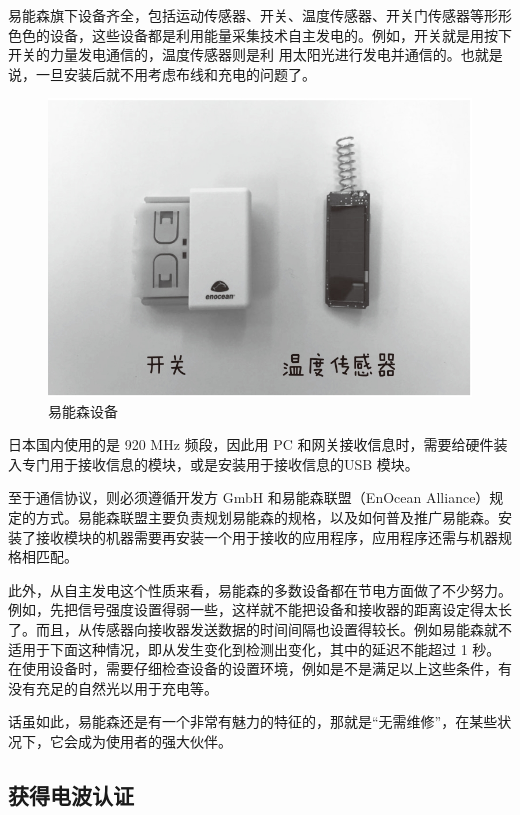 \documentclass[12pt,UTF8]{ctexbook}
\begin{document}
易能森旗下设备齐全，包括运动传感器、开关、温度传感器、开关门传感器等形形色色的设备，这些设备都是利用能量采集技术自主发电的。例如，开关就是用按下开关的力量发电通信的，温度传感器则是利
用太阳光进行发电并通信的。也就是说，一旦安装后就不用考虑布线和充电的问题了。

\begin{figure}[htbp]
	\centering
	\includegraphics[width=1\linewidth]{76}
	\caption{易能森设备}
	\label{fig:1}
\end{figure}

日本国内使用的是 920 MHz 频段，因此用 PC 和网关接收信息时，需要给硬件装入专门用于接收信息的模块，或是安装用于接收信息的USB 模块。

至于通信协议，则必须遵循开发方 GmbH 和易能森联盟（EnOcean Alliance）规定的方式。易能森联盟主要负责规划易能森的规格，以及如何普及推广易能森。安装了接收模块的机器需要再安装一个用于接收的应用程序，应用程序还需与机器规格相匹配。

此外，从自主发电这个性质来看，易能森的多数设备都在节电方面做了不少努力。例如，先把信号强度设置得弱一些，这样就不能把设备和接收器的距离设定得太长了。而且，从传感器向接收器发送数据的时间间隔也设置得较长。例如易能森就不适用于下面这种情况，即从发生变化到检测出变化，其中的延迟不能超过 1 秒。在使用设备时，需要仔细检查设备的设置环境，例如是不是满足以上这些条件，有没有充足的自然光以用于充电等。

话虽如此，易能森还是有一个非常有魅力的特征的，那就是“无需维修”，在某些状况下，它会成为使用者的强大伙伴。

\subsection{获得电波认证}
\end{document}
